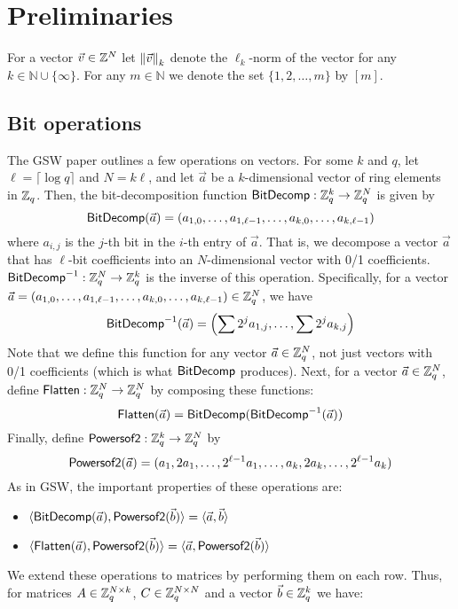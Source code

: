 \section{Preliminaries}\label{sec:prelim}

For a vector $\vec{v} \in \Z^N$ let $\norm{k}{\vec{v}}$ denote the $\ell_k$-norm of the vector for any $k \in \mathbb{N}\cup \{\infty\}$. For any $m \in \mathbb{N}$ we denote the set $\{1,2,\ldots,m\}$ by $[m]$.

\subsection{Bit operations}

The GSW paper outlines a few operations on vectors.  For some $k$ and $q$, let $\ell = \lceil \log q \rceil$ and $N = k\ell$, and let $\vec{a}$ be a $k$-dimensional vector of ring elements in $\Zq$.  Then, the bit-decomposition function $\bdfn: \Zq^k \to \Zq^N$ is given by $$\bdfn(\vec{a}) = (a_{1,0}, \ldots, a_{1, \ell-1}, \ldots, a_{k, 0}, \ldots, a_{k, \ell-1})$$ where $a_{i,j}$ is the $j$-th bit in the $i$-th entry of $\vec{a}$.  That is, we decompose a vector $\vec{a}$ that has $\ell$-bit coefficients into an $N$-dimensional vector with 0/1 coefficients.  $\bdifn: \Zq^N \to \Zq^k$ is the inverse of this operation.  Specifically, for a vector $\vec{a} = (a_{1,0}, \ldots, a_{1, \ell-1}, \ldots, a_{k, 0}, \ldots, a_{k, \ell-1}) \in \Zq^N$, we have $$\bdifn(\vec{a}) = \left(\sum 2^j a_{1,j}, \ldots, \sum 2^j a_{k, j}\right)$$  Note that we define this function for any vector $\vec{a} \in \Zq^N$, not just vectors with 0/1 coefficients (which is what $\bdfn$ produces).  Next, for a vector $\vec{a} \in \Zq^N$, define $\flattenfn: \Zq^N \to \Zq^N$ by composing these functions: $$\flattenfn(\vec{a}) = \bdfn(\bdifn(\vec{a}))$$  Finally, define $\powfn: \Zq^k \to \Zq^N$ by $$\powfn(\vec{a}) = (a_1, 2a_1, \ldots, 2^{\ell-1}a_1, \ldots, a_k, 2a_k, \ldots, 2^{\ell-1}a_k)$$  As in GSW, the important properties of these operations are:

\begin{itemize}
\item $\langle \bdfn(\vec{a}), \powfn(\vec{b}) \rangle = \langle \vec{a}, \vec{b} \rangle$
\item $\langle \flattenfn(\vec{a}), \powfn(\vec{b}) \rangle = \langle \vec{a}, \powfn(\vec{b}) \rangle$
\end{itemize}

We extend these operations to matrices by performing them on each row.  Thus, for matrices $A \in \Zq^{N \times k}$, $C \in \Zq^{N \times N}$ and a vector $\vec{b} \in \Zq^k$ we have:

